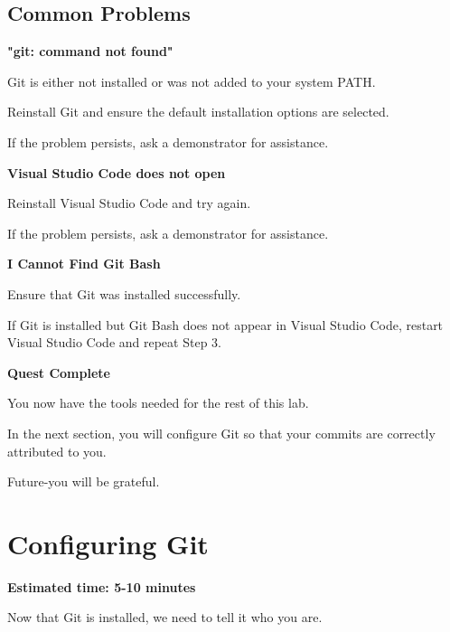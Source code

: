 \documentclass{csc2059practical}
\begin{document}
\subsection{Common Problems}
\begin{commonerror}
\textbf{"git: command not found"}\par
\medskip

Git is either not installed or was not added to your system PATH.


Reinstall Git and ensure the default installation options are selected.


If the problem persists, ask a demonstrator for assistance.


\end{commonerror}
\begin{commonerror}
\textbf{Visual Studio Code does not open}\par
\medskip

Reinstall Visual Studio Code and try again.


If the problem persists, ask a demonstrator for assistance.


\end{commonerror}
\begin{commonerror}
\textbf{I Cannot Find Git Bash}\par
\medskip

Ensure that Git was installed successfully.


If Git is installed but Git Bash does not appear in Visual Studio Code, restart Visual Studio Code and repeat Step 3.


\end{commonerror}
\begin{wrapupbox}
\textbf{Quest Complete}\par
\medskip

You now have the tools needed for the rest of this lab.


In the next section, you will configure Git so that your commits are correctly attributed to you.


Future-you will be grateful.


\end{wrapupbox}

\clearpage
\section{Configuring Git}
\begin{infobox}
\textbf{Estimated time: 5-10 minutes}
\end{infobox}
Now that Git is installed, we need to tell it who you are.
\end{document}
